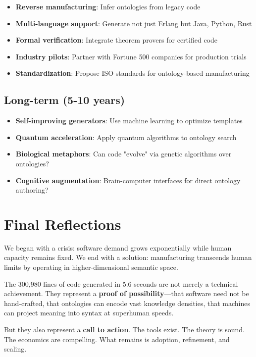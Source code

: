 \begin{itemize}
    \item \textbf{Reverse manufacturing}: Infer ontologies from legacy code
    \item \textbf{Multi-language support}: Generate not just Erlang but Java, Python, Rust
    \item \textbf{Formal verification}: Integrate theorem provers for certified code
    \item \textbf{Industry pilots}: Partner with Fortune 500 companies for production trials
    \item \textbf{Standardization}: Propose ISO standards for ontology-based manufacturing
\end{itemize}

\subsection{Long-term (5-10 years)}

\begin{itemize}
    \item \textbf{Self-improving generators}: Use machine learning to optimize templates
    \item \textbf{Quantum acceleration}: Apply quantum algorithms to ontology search
    \item \textbf{Biological metaphors}: Can code "evolve" via genetic algorithms over ontologies?
    \item \textbf{Cognitive augmentation}: Brain-computer interfaces for direct ontology authoring?
\end{itemize}

\section{Final Reflections}

We began with a crisis: software demand grows exponentially while human capacity remains fixed. We end with a solution: manufacturing transcends human limits by operating in higher-dimensional semantic space.

The 300,980 lines of code generated in 5.6 seconds are not merely a technical achievement. They represent a \textbf{proof of possibility}---that software need not be hand-crafted, that ontologies can encode vast knowledge densities, that machines can project meaning into syntax at superhuman speeds.

But they also represent a \textbf{call to action}. The tools exist. The theory is sound. The economics are compelling. What remains is adoption, refinement, and scaling.

